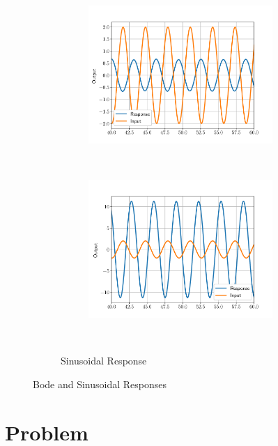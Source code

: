 \documentclass[titlepage, 11pt, reqno]{article}    %
\begin{document}
\begin{figure}[h]
\begin{subfigure}{0.49\textwidth}
\begin{subfigure}[htbp]{\textwidth}
            \includegraphics[width=\textwidth]{figures/G1_sinusoidal.pdf} 
        \end{subfigure} \\
        \begin{subfigure}[htbp]{\textwidth} 
            \includegraphics[width=\textwidth]{figures/G3_response.pdf} 
        \end{subfigure} 
        \caption{Sinusoidal Response}~\label{fig:sinusoidal_match}
    \end{subfigure}
    \caption{ Bode and Sinusoidal Responses}
\end{figure}
\clearpage
\section{Problem}
\end{document}
